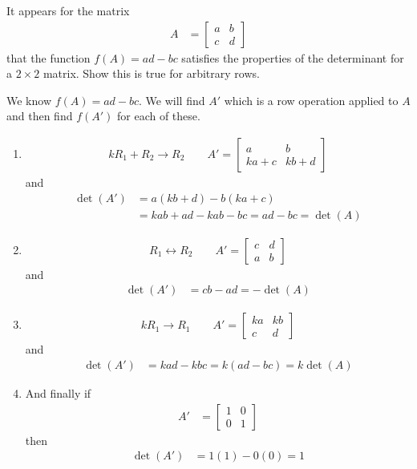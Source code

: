 \begin{example}
It appears for the matrix %
%
\begin{align*}
A & = \begin{bmatrix}
a & b \\ c & d
\end{bmatrix}
\end{align*}
that the function $f(A) = ad-bc$ satisfies the properties of the determinant for a $2 \times 2$ matrix.  Show this is true for arbitrary rows.

\solution

We know $f(A)=ad-bc$.  We will find $A'$ which is a row operation applied to $A$ and then find $f(A')$ for each of these.

\begin{enumerate}
\item
\begin{align*}
kR_1 +R_2 \rightarrow R_2  \qquad A' =  \begin{bmatrix}
a & b \\ ka +c & kb + d
\end{bmatrix}
\end{align*}
and
\begin{align*}
\det(A')  & = a(kb+d) - b(ka+c) \\
& = kab+ad-kab-bc = ad-bc = \det(A)
\end{align*}

\item
\begin{align*}
R_1 \leftrightarrow R_2 \qquad A' = \begin{bmatrix}
c & d \\ a & b
\end{bmatrix}
\end{align*}
and
\begin{align*}
\det(A') & = cb-ad = -\det(A)
\end{align*}

\item
\begin{align*}
kR_1 \rightarrow R_1 \qquad A' = \begin{bmatrix}
ka & kb \\ c & d
\end{bmatrix}
\end{align*}
and
\begin{align*}
\det(A') & = kad-kbc=k(ad-bc) = k\det(A)
\end{align*}

\item And finally if
%
\begin{align*}
A' & = \begin{bmatrix}
1 & 0 \\ 0 & 1
\end{bmatrix}
\end{align*}
then
%
\begin{align*}
\det(A') & = 1(1)-0(0) = 1
\end{align*}



\end{enumerate}
\end{example}
